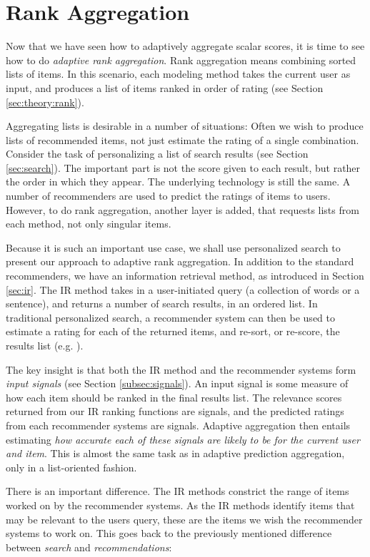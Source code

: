 \section{Rank Aggregation}
\label{sec:methods:rank}

Now that we have seen how to adaptively aggregate scalar scores, it is time to see how
to do \emph{adaptive rank aggregation}. Rank aggregation means combining sorted lists of items.
In this scenario, each modeling method takes the current user as input, and produces a
list of items ranked in order of rating
(see Section \ref{sec:theory:rank}).

Aggregating lists is desirable in a number of situations:
Often we wish to produce lists of recommended items, not just estimate the rating of a single combination.
Consider the task of personalizing a list of search results
(see Section \ref{sec:search}). The important part is not the score
given to each result, but rather the order in which they appear.
The underlying technology is still the same. A number of recommenders are used to predict the ratings
of items to users. However, to do rank aggregation, another layer is added, that requests lists from each method,
not only singular items.

Because it is such an important use case, we shall use personalized search to present our approach to adaptive rank aggregation.
In addition to the standard recommenders, we have an information retrieval method,
as introduced in Section \ref{sec:ir}.
The IR method takes in a user-initiated query (a collection of words or a sentence), and returns a number of 
search results, in an ordered list.
In traditional personalized search, a recommender system can then be used to estimate a rating for each of the returned items,
and re-sort, or re-score, the results list (e.g. \citet[p3]{Xu2008}).

The key insight is that both the IR method and the recommender systems form \emph{input signals}
(see Section \ref{subsec:signals}).
An input signal is some measure of how each item should be ranked in the final results list.
The relevance scores returned from our IR ranking functions are signals,
and the predicted ratings from each recommender systems are signals.
Adaptive aggregation then entails estimating \emph{how accurate each of these signals are likely to be for the current user and item}.
This is almost the same task as in adaptive prediction aggregation, only in a list-oriented fashion.

There is an important difference. The IR methods constrict the range of items worked on by the recommender systems.
As the IR methods identify items that may be relevant to the users query, these are the items we wish the recommender systems to work on.
This goes back to the previously mentioned difference between \emph{search} and \emph{recommendations}:


